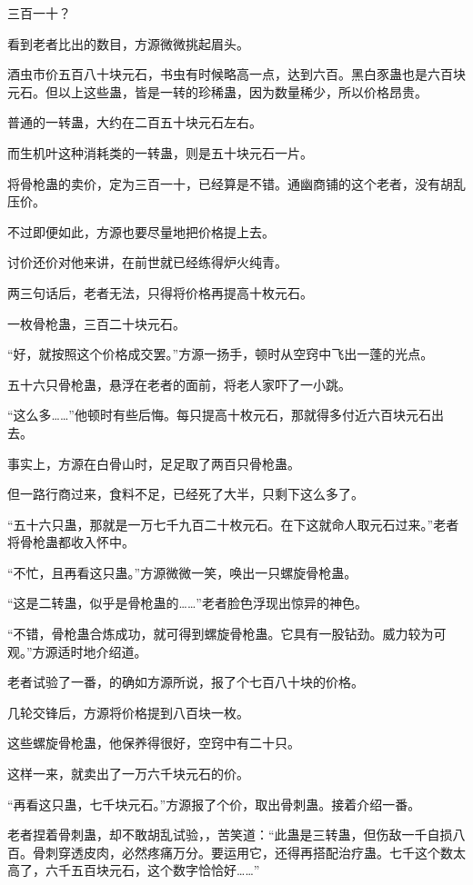 
\begin{this_body}

三百一十？

看到老者比出的数目，方源微微挑起眉头。

酒虫市价五百八十块元石，书虫有时候略高一点，达到六百。黑白豕蛊也是六百块元石。但以上这些蛊，皆是一转的珍稀蛊，因为数量稀少，所以价格昂贵。

普通的一转蛊，大约在二百五十块元石左右。

而生机叶这种消耗类的一转蛊，则是五十块元石一片。

将骨枪蛊的卖价，定为三百一十，已经算是不错。通幽商铺的这个老者，没有胡乱压价。

不过即便如此，方源也要尽量地把价格提上去。

讨价还价对他来讲，在前世就已经练得炉火纯青。

两三句话后，老者无法，只得将价格再提高十枚元石。

一枚骨枪蛊，三百二十块元石。

“好，就按照这个价格成交罢。”方源一扬手，顿时从空窍中飞出一蓬的光点。

五十六只骨枪蛊，悬浮在老者的面前，将老人家吓了一小跳。

“这么多……”他顿时有些后悔。每只提高十枚元石，那就得多付近六百块元石出去。

事实上，方源在白骨山时，足足取了两百只骨枪蛊。

但一路行商过来，食料不足，已经死了大半，只剩下这么多了。

“五十六只蛊，那就是一万七千九百二十枚元石。在下这就命人取元石过来。”老者将骨枪蛊都收入怀中。

“不忙，且再看这只蛊。”方源微微一笑，唤出一只螺旋骨枪蛊。

“这是二转蛊，似乎是骨枪蛊的……”老者脸色浮现出惊异的神色。

“不错，骨枪蛊合炼成功，就可得到螺旋骨枪蛊。它具有一股钻劲。威力较为可观。”方源适时地介绍道。

老者试验了一番，的确如方源所说，报了个七百八十块的价格。

几轮交锋后，方源将价格提到八百块一枚。

这些螺旋骨枪蛊，他保养得很好，空窍中有二十只。

这样一来，就卖出了一万六千块元石的价。

“再看这只蛊，七千块元石。”方源报了个价，取出骨刺蛊。接着介绍一番。

老者捏着骨刺蛊，却不敢胡乱试验，，苦笑道：“此蛊是三转蛊，但伤敌一千自损八百。骨刺穿透皮肉，必然疼痛万分。要运用它，还得再搭配治疗蛊。七千这个数太高了，六千五百块元石，这个数字恰恰好……”


\end{this_body}
